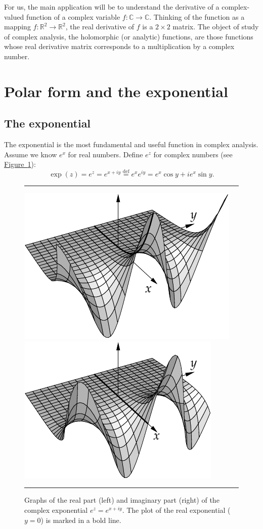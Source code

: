 \documentclass[12pt,openany]{book}
\newcommand{\C}{{\mathbb{C}}}
\newcommand{\R}{{\mathbb{R}}}
\theoremstyle{plain}
\theoremstyle{remark}
\theoremstyle{definition}
\newenvironment{myfig}{%
\begin{figure}[h!t]
\noindent\rule{\textwidth}{0.5pt}\vspace{12pt}\par\centering}%
{\par\noindent\rule{\textwidth}{0.5pt}
\end{figure}}
\theoremstyle{exercise}
\theoremstyle{example}
\newcommand{\figureref}[1]{\hyperref[#1]{Figure~\ref*{#1}}}
\begin{document}
For us, the main application will be to understand the derivative of a
complex-valued function of a complex variable $f \colon \C \to \C$.
Thinking of the function as a mapping $f \colon \R^2 \to \R^2$,
the real derivative of $f$ is a $2 \times 2$ matrix.  The
object of study of complex analysis, the holomorphic (or analytic)
functions, are those functions whose real derivative matrix corresponds to a
multiplication by a complex number.


\section{Polar form and the exponential}

\subsection{The exponential} \label{subsection:firstdefexp}

The exponential is the most fundamental and useful function in complex
analysis.  Assume we know $e^x$ for real numbers.  Define $e^z$
for complex numbers (see
\figureref{fig:complexexpgraphs}):
%
\begin{equation*}
\exp(z) =
e^{z} = 
e^{x+iy}
\overset{\text{def}}{=}
e^x e^{iy}
=
e^x\cos y + i e^x \sin y .
\end{equation*}
\begin{myfig}
\includegraphics{figures/realexp}
\qquad
\includegraphics{figures/imagexp}
\caption{Graphs of the real part (left) and imaginary part (right)
of the complex exponential $e^z = e^{x+iy}$.
The plot of the real exponential ($y=0$)
is marked in a bold line.\label{fig:complexexpgraphs}}
\end{myfig}
\end{document}
